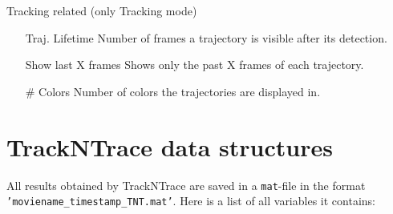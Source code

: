 \documentclass[11pt,onside]{report}
\numberwithin{equation}{chapter}
\begin{document}
\textsf{Tracking related (only \textsf{Tracking} mode)}
\begin{itemize}[leftmargin=3.5cm]
\item[Traj. Lifetime] Number of frames a trajectory is visible after its detection.
\item[Show last X frames] Shows only the past X frames of each trajectory.
\item[\# Colors] Number of colors the trajectories are displayed in. 
\end{itemize}

\clearpage
\section{TrackNTrace data structures}
All results obtained by TrackNTrace are saved in a \texttt{mat}-file in the format \texttt{'moviename\_timestamp\_TNT.mat'}. Here is a list of all variables it contains:
\end{document}
